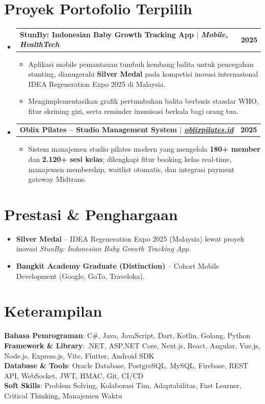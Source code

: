 \documentclass[letterpaper,10pt]{article}
\makeatletter
\newcommand{\resumeItem}[1]{
  \item\small{
    {#1 \vspace{-1.5pt}}
  }
}
\newcommand{\resumeProjectHeading}[2]{
  \vspace{1pt}\item
    \begin{tabular*}{1.0\textwidth}[t]{l@{\extracolsep{\fill}}r}
      \textbf{#1} & \textbf{\small #2} \\
    \end{tabular*}\vspace{-4pt}
}
\newcommand{\resumeSubHeadingListStart}{\begin{itemize}[leftmargin=0.0in, label={}]}
\newcommand{\resumeSubHeadingListEnd}{\end{itemize}\vspace{1pt}}
\newcommand{\resumeItemListStart}{\begin{itemize}[leftmargin=0.15in, label={--}, itemsep=1.5pt, parsep=0pt]}
\newcommand{\resumeItemListEnd}{\end{itemize}\vspace{-2pt}}
\makeatother
\begin{document}
\section{Proyek Portofolio Terpilih}
\resumeSubHeadingListStart
    \resumeProjectHeading
      {\textbf{StunBy: Indonesian Baby Growth Tracking App} $|$ \emph{Mobile, HealthTech}}{2025}
      \resumeItemListStart
        \resumeItem{Aplikasi mobile pemantauan tumbuh kembang balita untuk pencegahan stunting, dianugerahi \textbf{Silver Medal} pada kompetisi inovasi internasional IDEA Regeneration Expo 2025 di Malaysia.}
        \resumeItem{Mengimplementasikan grafik pertumbuhan balita berbasis standar WHO, fitur skrining gizi, serta reminder imunisasi berkala bagi orang tua.}
      \resumeItemListEnd

    \resumeProjectHeading
      {\textbf{Oblix Pilates -- Studio Management System} $|$ \emph{\href{https://oblixpilates.id}{oblixpilates.id}}}{2025}
      \resumeItemListStart
        \resumeItem{Sistem manajemen studio pilates modern yang mengelola \textbf{180+ member} dan \textbf{2.120+ sesi kelas}; dilengkapi fitur booking kelas real-time, manajemen membership, waitlist otomatis, dan integrasi payment gateway Midtrans.}
      \resumeItemListEnd
\resumeSubHeadingListEnd

\section{Prestasi \& Penghargaan}
\resumeItemListStart
    \resumeItem{\textbf{Silver Medal} -- IDEA Regeneration Expo 2025 (Malaysia) lewat proyek inovasi \textit{StunBy: Indonesian Baby Growth Tracking App}.}
    \resumeItem{\textbf{Bangkit Academy Graduate (Distinction)} -- Cohort Mobile Development (Google, GoTo, Traveloka).}
\resumeItemListEnd

\section{Keterampilan}
\begin{itemize}[leftmargin=0.0in, label={}]
    \small{\item{
     \textbf{Bahasa Pemrograman}{: C\#, Java, JavaScript, Dart, Kotlin, Golang, Python} \\ \vspace{3pt}
     \textbf{Framework \& Library}{: .NET, ASP.NET Core, Next.js, React, Angular, Vue.js, Node.js, Express.js, Vite, Flutter, Android SDK} \\ \vspace{3pt}
     \textbf{Database \& Tools}{: Oracle Database, PostgreSQL, MySQL, Firebase, REST API, WebSocket, JWT, HMAC, Git, CI/CD} \\ \vspace{3pt}
     \textbf{Soft Skills}{: Problem Solving, Kolaborasi Tim, Adaptabilitas, Fast Learner, Critical Thinking, Manajemen Waktu}
    }}
\end{itemize}
\end{document}
